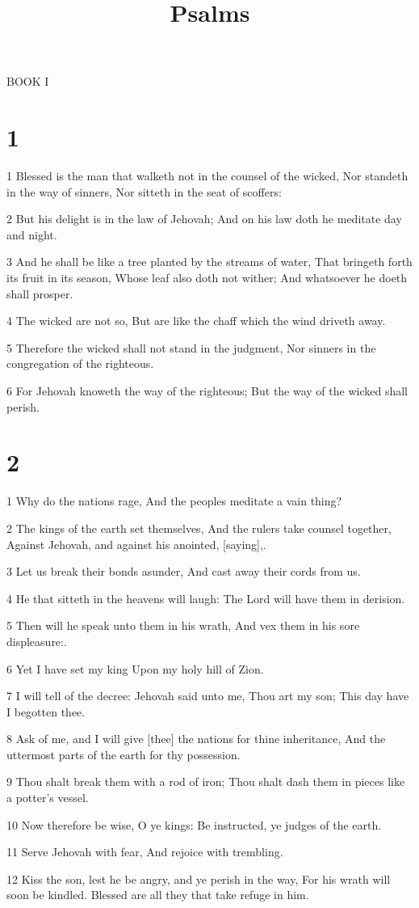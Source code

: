 

\title{Psalms}

\par BOOK I 

\chapter{1}

\par 1 Blessed is the man that walketh not in the counsel of the wicked, Nor standeth in the way of sinners, Nor sitteth in the seat of scoffers:
\par 2 But his delight is in the law of Jehovah; And on his law doth he meditate day and night.
\par 3 And he shall be like a tree planted by the streams of water, That bringeth forth its fruit in its season, Whose leaf also doth not wither; And whatsoever he doeth shall prosper.
\par 4 The wicked are not so, But are like the chaff which the wind driveth away.
\par 5 Therefore the wicked shall not stand in the judgment, Nor sinners in the congregation of the righteous.
\par 6 For Jehovah knoweth the way of the righteous; But the way of the wicked shall perish.

\chapter{2}

\par 1 Why do the nations rage, And the peoples meditate a vain thing?
\par 2 The kings of the earth set themselves, And the rulers take counsel together, Against Jehovah, and against his anointed, [saying],.
\par 3 Let us break their bonds asunder, And cast away their cords from us.
\par 4 He that sitteth in the heavens will laugh: The Lord will have them in derision.
\par 5 Then will he speak unto them in his wrath, And vex them in his sore displeasure:.
\par 6 Yet I have set my king Upon my holy hill of Zion.
\par 7 I will tell of the decree: Jehovah said unto me, Thou art my son; This day have I begotten thee.
\par 8 Ask of me, and I will give [thee] the nations for thine inheritance, And the uttermost parts of the earth for thy possession.
\par 9 Thou shalt break them with a rod of iron; Thou shalt dash them in pieces like a potter's vessel.
\par 10 Now therefore be wise, O ye kings: Be instructed, ye judges of the earth.
\par 11 Serve Jehovah with fear, And rejoice with trembling.
\par 12 Kiss the son, lest he be angry, and ye perish in the way, For his wrath will soon be kindled. Blessed are all they that take refuge in him.

